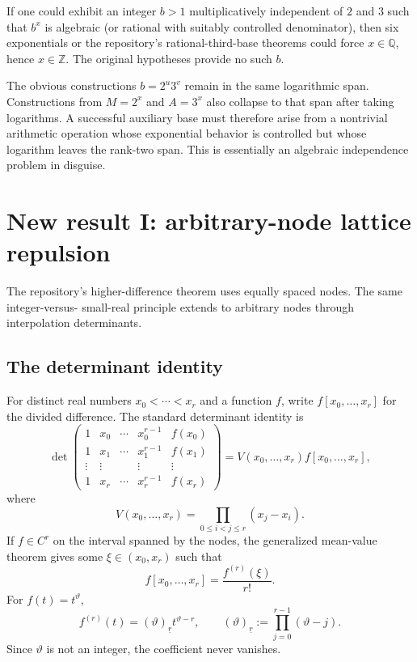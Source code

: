 \documentclass[11pt,oneside]{article}
\theoremstyle{definition}
\theoremstyle{remark}
\newcommand{\Z}{\mathbb Z}
\newcommand{\Q}{\mathbb Q}
\newcommand{\thetaq}{\vartheta}
\newcommand{\fall}[2]{\left(#1\right)_{\!\underline{#2}}}
\begin{document}
If one could exhibit an integer $b>1$ multiplicatively independent of $2$ and $3$ such that
$b^x$ is algebraic (or rational with suitably controlled denominator), then six exponentials
or the repository's rational-third-base theorems could force $x\in\Q$, hence $x\in\Z$.
The original hypotheses provide no such $b$.

The obvious constructions $b=2^u3^v$ remain in the same logarithmic span.  Constructions from
$M=2^x$ and $A=3^x$ also collapse to that span after taking logarithms.  A successful auxiliary
base must therefore arise from a nontrivial arithmetic operation whose exponential behavior is
controlled but whose logarithm leaves the rank-two span.  This is essentially an algebraic
independence problem in disguise.

\section{New result I: arbitrary-node lattice repulsion}
\label{sec:arbitrary-node}

The repository's higher-difference theorem uses equally spaced nodes.  The same integer-versus-
small-real principle extends to arbitrary nodes through interpolation determinants.

\subsection{The determinant identity}

For distinct real numbers $x_0<\cdots<x_r$ and a function $f$, write
$f[x_0,\ldots,x_r]$ for the divided difference.  The standard determinant identity is
\begin{equation}
 \det
 \begin{pmatrix}
  1&x_0&\cdots&x_0^{r-1}&f(x_0)\\
  1&x_1&\cdots&x_1^{r-1}&f(x_1)\\
  \vdots&\vdots&&\vdots&\vdots\\
  1&x_r&\cdots&x_r^{r-1}&f(x_r)
 \end{pmatrix}
 =V(x_0,\ldots,x_r)f[x_0,\ldots,x_r],
 \label{eq:det-divdiff}
\end{equation}
where
\[
 V(x_0,\ldots,x_r)=\prod_{0\le i<j\le r}(x_j-x_i).
\]
If $f\in C^r$ on the interval spanned by the nodes, the generalized mean-value theorem gives
some $\xi\in(x_0,x_r)$ such that
\begin{equation}
 f[x_0,\ldots,x_r]=\frac{f^{(r)}(\xi)}{r!}.
 \label{eq:divdiff-mvt}
\end{equation}
For $f(t)=t^{\thetaq}$,
\[
 f^{(r)}(t)=\fall{\thetaq}{r}t^{\thetaq-r},
 \qquad
 \fall{\thetaq}{r}:=\prod_{j=0}^{r-1}(\thetaq-j).
\]
Since $\thetaq$ is not an integer, the coefficient never vanishes.
\end{document}
